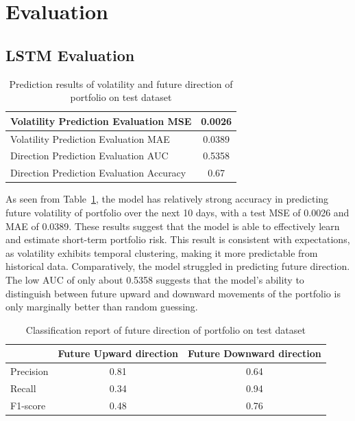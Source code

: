 \section{Evaluation}
\label{sec:evaluation}

\subsection{LSTM Evaluation}

\begin{table}[h]
    \centering
    \begin{tabular}{|l|c|}
        \hline
        Volatility Prediction Evaluation MSE & 0.0026 \\
        \hline
        Volatility Prediction Evaluation MAE &  0.0389 \\
        \hline
        Direction Prediction Evaluation AUC & 0.5358 \\
        \hline
        Direction Prediction Evaluation Accuracy & 0.67 \\
        \hline
    \end{tabular}

    \caption{Prediction results of volatility and future direction of portfolio on test dataset}
    \label{tab:lstm_prediction_results}
\end{table}

As seen from Table~\ref{tab:lstm_prediction_results}, the model has relatively strong accuracy in predicting future volatility of portfolio over the next 10 days, with a test MSE of 0.0026 and MAE of 0.0389. These results suggest that the model is able to effectively learn and estimate short-term portfolio risk. This result is consistent with expectations, as volatility exhibits temporal clustering, making it more predictable from historical data. Comparatively, the model struggled in predicting future direction. The low AUC of only about 0.5358 suggests that the model’s ability to distinguish between future upward and downward movements of the portfolio is only marginally better than random guessing. 

\begin{table}[h]
    \centering
    \begin{tabular}{|l|c|c|}
        \hline
          & Future Upward direction & Future Downward direction \\
        \hline
        Precision & 0.81 & 0.64 \\
        \hline
        Recall & 0.34 & 0.94 \\
        \hline
        F1-score & 0.48 & 0.76 \\
        \hline
    \end{tabular}

    \caption{Classification report of future direction of portfolio on test dataset}
    \label{tab:lstm_classification_report}
\end{table}

